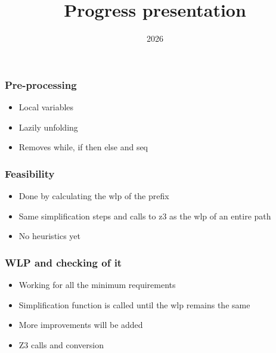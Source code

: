 \documentclass{beamer}
\title{Progress presentation}
\date{2026}
\begin{document}
\frame{\titlepage}

\begin{frame}
\frametitle{Pre-processing}
\begin{itemize}
  \item Local variables
  \item Lazily unfolding
  \item Removes while, if then else and seq

\end{itemize}
\end{frame}

\begin{frame}
\frametitle{Feasibility}
\begin{itemize}
  \item Done by calculating the wlp of the prefix
  \item Same simplification steps and calls to z3 as the wlp of an entire path
  \item No heuristics yet
\end{itemize}
\end{frame}

\begin{frame}
\frametitle{WLP and checking of it}
\begin{itemize}
  \item Working for all the minimum requirements
  \item Simplification function is called until the wlp remains the same 
  \item More improvements will be added
  \item Z3 calls and conversion
\end{itemize}
\end{frame}
\end{document}
